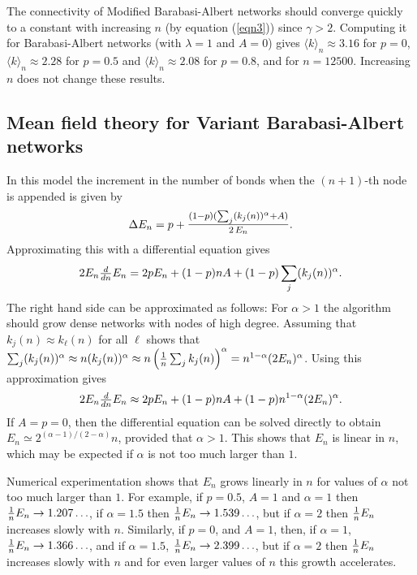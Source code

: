 \documentclass[12pt]{iopart}
\def\sfrac#1#2{\hbox{\normalsize $\frac{#1}{#2}$}}
\def\Sfrac#1#2{\hbox{\large$\frac{#1}{#2}$}}
\def\Ref#1{(\ref{#1})}
\begin{document}
The connectivity of Modified Barabasi-Albert networks should converge quickly to a 
constant with increasing $n$ (by equation \Ref{eqn3}) since $\gamma>2$.  Computing
it for Barabasi-Albert networks (with $\lambda=1$ and $A=0$) gives
$\langle k\rangle_n \approx 3.16$ for $p=0$, $\langle k\rangle_n \approx 2.28$ for $p=0.5$
and $\langle k\rangle_n \approx 2.08$ for $p=0.8$, and for $n=12500$.  Increasing $n$
does not change these results.


\subsection{Mean field theory for Variant Barabasi-Albert networks}

In this model the increment in the number of bonds when the $(n+1)$-th node is appended
is given by
\begin{equation}
\Delta E_n = p + \Sfrac{(1-p)(\sum_j (k_j(n))^\alpha + A)}{2\, E_n} .
\end{equation}
Approximating this with a differential equation gives
\begin{equation}
2E_n\sfrac{d}{dn} E_n = 2p E_n + (1-p)nA + (1-p)\sum_j (k_j(n))^\alpha .
\end{equation}
The right hand side can be approximated as follows:  For $\alpha>1$ the algorithm
should grow dense networks with nodes of high degree.  Assuming that $k_j(n) \approx
k_\ell(n)$ for all $\ell$ shows that $\sum_j (k_j(n))^\alpha \approx n (k_j(n))^\alpha
\approx n\left(\sfrac{1}{n} \sum_j k_j (n) \right)^\alpha
= n^{1-\alpha} (2E_n)^\alpha$.  Using this approximation gives
\begin{equation}
2E_n\sfrac{d}{dn} E_n \approx  2p E_n + (1-p)nA + (1-p)n^{1-\alpha}(2E_n)^\alpha.
\label{eqn21}  %
\end{equation}
If $A=p=0$, then the differential equation can be solved directly to obtain
$E_n \simeq 2^{(\alpha-1)/(2-\alpha)} n$, provided that $\alpha>1$. This shows that
$E_n$ is linear in $n$, which may be expected if $\alpha$ is not too much larger 
than $1$.

Numerical experimentation shows that $E_n$ grows linearly in $n$ for values
of $\alpha$ not too much larger than $1$.  For example, if $p=0.5$, $A=1$ and $\alpha=1$ then 
$\sfrac{1}{n} E_n \to 1.207\ldots$, if $\alpha=1.5$ then
$\sfrac{1}{n} E_n \to 1.539\ldots$, but if $\alpha=2$ then $\sfrac{1}{n}E_n$ increases
slowly with $n$.  Similarly, if $p=0$, and $A=1$, then, if $\alpha=1$,
$\sfrac{1}{n} E_n \to 1.366\ldots$, and if $\alpha=1.5$,
$\sfrac{1}{n} E_n \to 2.399\ldots$, but if $\alpha=2$ then $\sfrac{1}{n}E_n$ increases
slowly with $n$ and for even larger values of $n$ this growth accelerates. 
\end{document}
